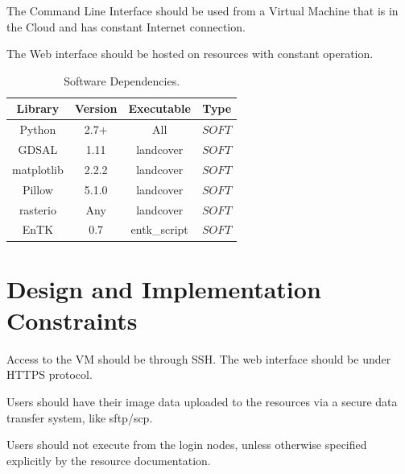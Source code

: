 \documentclass{scrreprt}
\begin{document}
The Command Line Interface should be used from a Virtual Machine that is in the 
Cloud and has constant Internet connection.

The Web interface should be hosted on resources with constant operation.

\begin{table}
	\centering
	\begin{tabular}{|c|c|c|c|}
		\hline
		Library & Version & Executable & Type\\\hline
		Python        & 2.7+     & All              & $SOFT$\\\hline
		GDSAL         & 1.11     & landcover        & $SOFT$ \\\hline
		matplotlib    & 2.2.2    & landcover           & $SOFT$ \\\hline
		Pillow        & 5.1.0    & landcover & $SOFT$ \\\hline
		rasterio      & Any      & landcover & $SOFT$ \\\hline
		EnTK          & 0.7      & entk\_script     & $SOFT$ \\\hline
		\hline
	\end{tabular}
	\caption{Software Dependencies.\label{tab:software_dependencies}}
\end{table}

\section{Design and Implementation Constraints}

Access to the VM should be through SSH. The web interface should be under HTTPS 
protocol.

Users should have their image data uploaded to the resources via a secure data 
transfer system, like sftp/scp.

Users should not execute from the login nodes, unless otherwise specified explicitly 
by the resource documentation.
\end{document}
